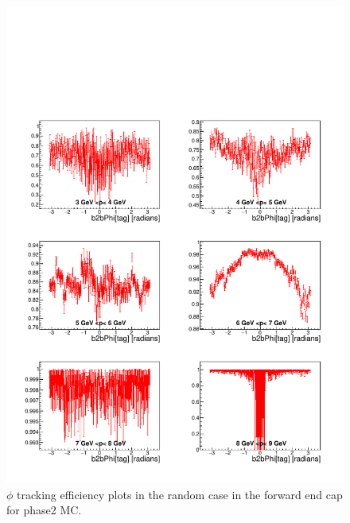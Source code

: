 \documentclass[a4paper,11pt,twosided,final,german,openbib,pdftex,listof=totoc,bibliography=totoc]{scrbook}
\begin{document}
\begin{appendix}
\begin{figure}[!htbp]
	\centering
	\includegraphics[width=\textwidth]{Plots/master/xPMPhiRandomFC_MC}
	\caption[Momentum $\phi$ Random Forward End Cap Efficiency Phase2 MC]{$\phi$ tracking efficiency plots in the random case in the forward end cap for phase2 MC.}
	\label{plt:PMPhiRandomFC_MC}
\end{figure}



\end{appendix}
\end{document}
